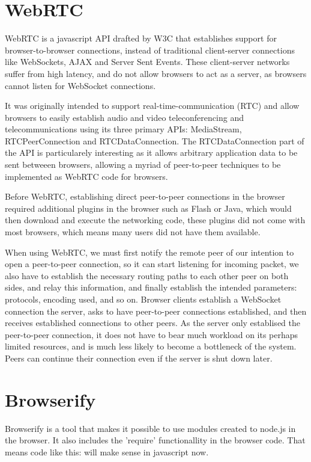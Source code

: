 \section{WebRTC}
WebRTC is a javascript API drafted by W3C that establishes support for browser-to-browser connections,
instead of traditional client-server connections like WebSockets, AJAX and Server Sent Events.
These client-server networks suffer from high latency, and do not allow browsers to act as a server,
as browsers cannot listen for WebSocket connections.

It was originally intended to support real-time-communication (RTC) 
and allow browsers to easily establish audio and video teleconferencing and telecommunications
using its three primary APIs: MediaStream, RTCPeerConnection and RTCDataConnection.
The RTCDataConnection part of the API is particularely interesting
as it allows arbitrary application data to be sent betweeen browsers,
allowing a myriad of peer-to-peer techniques to be implemented as WebRTC code for browsers.

Before WebRTC, establishing direct peer-to-peer connections in the browser required
additional plugins in the browser such as Flash or Java, which would then download and
execute the networking code,
these plugins did not come with most browsers,
which means many users did not have them available.
\newline

\label{webrtc-connection-server}
When using WebRTC, we must first notify the remote peer of our intention
to open a peer-to-peer connection, so it can start listening for incoming packet,
we also have to establish the necessary routing paths to each other peer on both sides,
and relay this information,
and finally establish the intended parameters: protocols, encoding used, and so on.
Browser clients establish a WebSocket connection the server, 
asks to have peer-to-peer connections established,
and then receives established connections to other peers.
As the server only establised the peer-to-peer connection, 
it does not have to bear much workload on its perhaps limited resources,
and is much less likely to become a bottleneck of the system.
Peers can continue their connection even if the server is shut down later.

\section{Browserify}
Browserify is a tool that makes it possible to use modules created to node.js in the browser. It also includes the 'require' functionallity in the browser code. That means code like this:
will make sense in javascript now.

